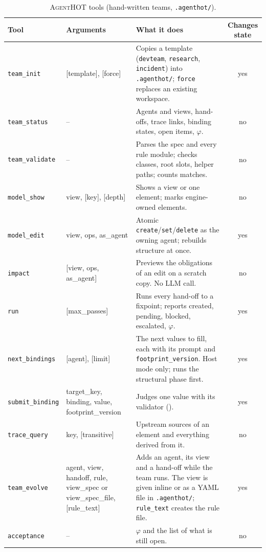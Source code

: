\documentclass[10pt,a4paper]{article}
\newcommand{\tool}{\textsc{AgentHOT}}
\newcommand{\code}[1]{\texttt{#1}}
\newcommand{\file}[1]{\texttt{#1}}
\newcommand{\mcptool}[1]{\texttt{#1}}
\begin{document}
\begin{table}[!htb]
\centering\small
\caption{\tool{} tools (hand-written teams, \file{.agenthot/}).}
\label{tab:tools-a}
\begin{tabularx}{\textwidth}{@{}L{3.1cm} L{3.4cm} Y c@{}}
\toprule
{}Tool & Arguments & What it does & Changes state \\
\midrule
\mcptool{team\_init} & [template], [force] & Copies a template (\code{devteam}, \code{research}, \code{incident}) into \file{.agenthot/}; \code{force} replaces an existing workspace. & yes \\
\mcptool{team\_status} & -- & Agents and views, hand-offs, trace links, binding states, open items, $\varphi$. & no \\
\mcptool{team\_validate} & -- & Parses the spec and every rule module; checks classes, root slots, helper paths; counts matches. & no \\
\mcptool{model\_show} & view, [key], [depth] & Shows a view or one element; marks engine-owned elements. & no \\
\mcptool{model\_edit} & view, ops, as\_agent & Atomic \code{create}/\code{set}/\code{delete} as the owning agent; rebuilds structure at once. & yes \\
\mcptool{impact} & [view, ops, as\_agent] & Previews the obligations of an edit on a scratch copy. No LLM call. & no \\
\mcptool{run} & [max\_passes] & Runs every hand-off to a fixpoint; reports created, pending, blocked, escalated, $\varphi$. & yes \\
\mcptool{next\_bindings} & [agent], [limit] & The next values to fill, each with its prompt and \code{footprint\_version}. Host mode only; runs the structural phase first. & yes \\
\mcptool{submit\_binding} & target\_key, binding, value, footprint\_version & Judges one value with its validator (). & yes \\
\mcptool{trace\_query} & key, [transitive] & Upstream sources of an element and everything derived from it. & no \\
\mcptool{team\_evolve} & agent, view, handoff, rule, view\_spec or view\_spec\_file, [rule\_text] & Adds an agent, its view and a hand-off while the team runs. The view is given inline or as a YAML file in \file{.agenthot/}; \code{rule\_text} creates the rule file. & yes \\
\mcptool{acceptance} & -- & $\varphi$ and the list of what is still open. & no \\
\bottomrule
\end{tabularx}
\end{table}
\end{document}
